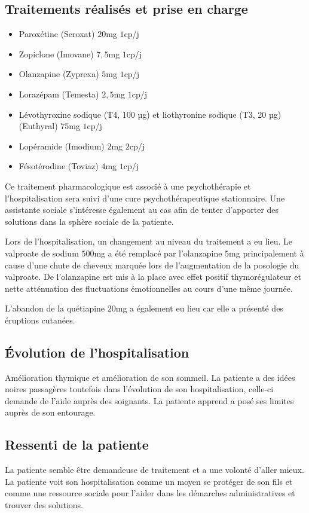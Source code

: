 \subsection{Traitements réalisés et prise en charge} 
\begin{itemize}[label=\textbullet]
    \item Paroxétine (Seroxat)  $20$mg $1$cp/j
    \item Zopiclone (Imovane) $7,5$mg $1$cp/j
    \item Olanzapine (Zyprexa) $5$mg $1$cp/j 
    \item Lorazépam (Temesta) $2,5$mg $1$cp/j
    \item Lévothyroxine sodique (T4, 100 µg) et liothyronine sodique (T3, 20 µg) (Euthyral) $75$mg $1$cp/j 
    \item Lopéramide (Imodium) $2$mg $2$cp/j
    \item Fésotérodine (Toviaz) $4$mg $1$cp/j 
\end{itemize}
 
Ce traitement pharmacologique est associé à une psychothérapie et l’hospitalisation sera suivi d’une cure psychothérapeutique stationnaire. 
Une assistante sociale s’intéresse également au cas afin de tenter d’apporter des solutions dans la sphère sociale de la patiente. 
 
Lors de l’hospitalisation, un changement au niveau du traitement a eu lieu. Le valproate de sodium $500$mg a été remplacé par l’olanzapine $5$mg principalement à cause d’une chute de cheveux marquée lors de l’augmentation de la posologie du valproate. De l’olanzapine est mis à la place avec effet positif thymorégulateur et nette atténuation des fluctuations émotionnelles au cours d’une même journée. 
 
L’abandon de la quétiapine $20$mg a également eu lieu car elle a présenté des éruptions cutanées. 

\subsection{Évolution de l’hospitalisation }
Amélioration thymique et amélioration de son sommeil. 
La patiente a des idées noires passagères toutefois dans l’évolution de son hospitalisation, celle-ci demande de l’aide auprès des soignants. 
La patiente apprend a posé ses limites auprès de son entourage. 

\subsection{Ressenti de la patiente}
La patiente semble être demandeuse de traitement et a une volonté d’aller mieux. La patiente voit son hospitalisation comme un moyen se protéger de son fils et comme une ressource sociale pour l’aider dans les démarches administratives et trouver des solutions.
 
